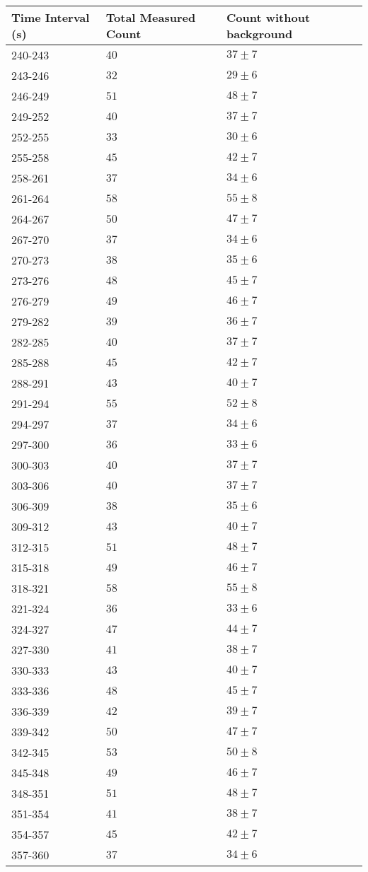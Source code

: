\begin{tabular}{| p{} | p{} | p{} |}\hline
Time Interval (s) & Total Measured Count & Count without background\\
\hline
240-243 & $40$ & $37\pm 7$\\
243-246 & $32$ & $29\pm 6$\\
246-249 & $51$ & $48\pm 7$\\
249-252 & $40$ & $37\pm 7$\\
252-255 & $33$ & $30\pm 6$\\
255-258 & $45$ & $42\pm 7$\\
258-261 & $37$ & $34\pm 6$\\
261-264 & $58$ & $55\pm 8$\\
264-267 & $50$ & $47\pm 7$\\
267-270 & $37$ & $34\pm 6$\\
270-273 & $38$ & $35\pm 6$\\
273-276 & $48$ & $45\pm 7$\\
276-279 & $49$ & $46\pm 7$\\
279-282 & $39$ & $36\pm 7$\\
282-285 & $40$ & $37\pm 7$\\
285-288 & $45$ & $42\pm 7$\\
288-291 & $43$ & $40\pm 7$\\
291-294 & $55$ & $52\pm 8$\\
294-297 & $37$ & $34\pm 6$\\
297-300 & $36$ & $33\pm 6$\\
300-303 & $40$ & $37\pm 7$\\
303-306 & $40$ & $37\pm 7$\\
306-309 & $38$ & $35\pm 6$\\
309-312 & $43$ & $40\pm 7$\\
312-315 & $51$ & $48\pm 7$\\
315-318 & $49$ & $46\pm 7$\\
318-321 & $58$ & $55\pm 8$\\
321-324 & $36$ & $33\pm 6$\\
324-327 & $47$ & $44\pm 7$\\
327-330 & $41$ & $38\pm 7$\\
330-333 & $43$ & $40\pm 7$\\
333-336 & $48$ & $45\pm 7$\\
336-339 & $42$ & $39\pm 7$\\
339-342 & $50$ & $47\pm 7$\\
342-345 & $53$ & $50\pm 8$\\
345-348 & $49$ & $46\pm 7$\\
348-351 & $51$ & $48\pm 7$\\
351-354 & $41$ & $38\pm 7$\\
354-357 & $45$ & $42\pm 7$\\
357-360 & $37$ & $34\pm 6$\\
\hline
\end{tabular}\quad
